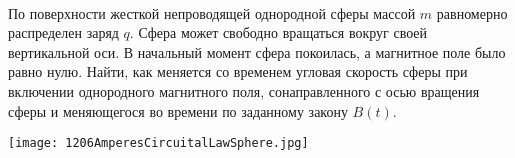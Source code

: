 \begin{ex}
\hspace{0pt} \\
\begin{minipage}{.65\textwidth}
По поверхности жесткой непроводящей однородной сферы массой $m$ равномерно распределен заряд $q$. 
Сфера может свободно вращаться вокруг своей вертикальной оси. В начальный момент сфера покоилась, а магнитное поле было равно нулю. 
Найти, как меняется со временем угловая скорость сферы при включении однородного магнитного поля, 
сонаправленного с осью вращения сферы и меняющегося во времени по заданному закону $B(t)$.
\end{minipage}
\begin{minipage}{.35\textwidth}
\centering
\texttt{[image: 1206AmperesCircuitalLawSphere.jpg]}
\end{minipage}
\begin{ans}
\end{ans}
\end{ex}